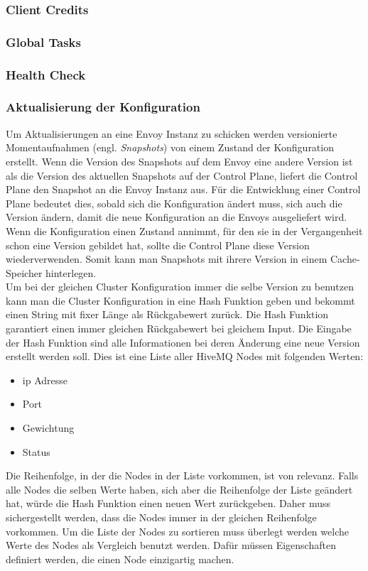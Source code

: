 \subsubsection{Client Credits}
\subsubsection{Global Tasks}

\subsubsection{Health Check}

\subsubsection{Aktualisierung der Konfiguration}
Um Aktualisierungen an eine Envoy Instanz zu schicken werden versionierte Momentaufnahmen (engl. \textit{Snapshots}) von einem Zustand der Konfiguration erstellt. Wenn die Version des Snapshots auf dem Envoy eine andere Version ist als die Version des aktuellen Snapshots auf der Control Plane, liefert die Control Plane den Snapshot an die Envoy Instanz aus.
Für die Entwicklung einer Control Plane bedeutet dies, sobald sich die Konfiguration ändert muss, sich auch die Version ändern, damit die neue Konfiguration an die Envoys ausgeliefert wird. Wenn die Konfiguration einen Zustand annimmt, für den sie in der Vergangenheit schon eine Version gebildet hat, sollte die Control Plane diese Version wiederverwenden. Somit kann man Snapshots mit ihrere Version in einem Cache-Speicher hinterlegen.
\\
Um bei der gleichen Cluster Konfiguration immer die selbe Version zu benutzen kann man die Cluster Konfiguration in eine Hash Funktion geben und bekommt einen String mit fixer Länge als Rückgabewert zurück. Die Hash Funktion garantiert einen immer gleichen Rückgabewert bei gleichem Input.
Die Eingabe der Hash Funktion sind alle Informationen bei deren Änderung eine neue Version erstellt werden soll. Dies ist eine Liste aller HiveMQ Nodes mit folgenden Werten:
\begin{itemize}
  \item \ac{ip} Adresse
  \item Port
  \item Gewichtung
  \item Status
\end{itemize}
Die Reihenfolge, in der die Nodes in der Liste vorkommen, ist von relevanz. Falls alle Nodes die selben Werte haben, sich aber die Reihenfolge der Liste geändert hat, würde die Hash Funktion einen neuen Wert zurückgeben. Daher muss sichergestellt werden, dass die Nodes immer in der gleichen Reihenfolge vorkommen. Um die Liste der Nodes zu sortieren muss überlegt werden welche Werte des Nodes als Vergleich benutzt werden. Dafür müssen Eigenschaften definiert werden, die einen Node einzigartig machen.
